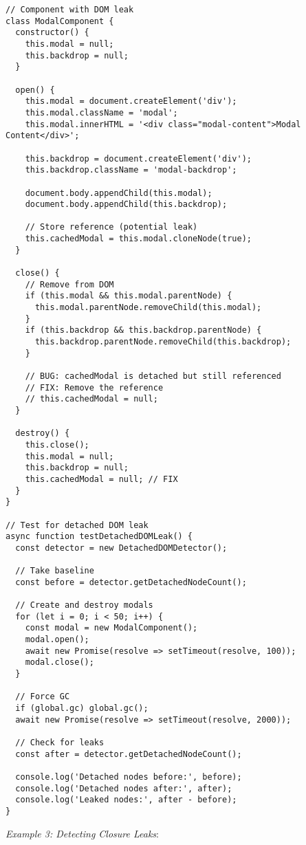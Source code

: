 \documentclass[11pt]{article}
\begin{document}
\begin{verbatim}
// Component with DOM leak
class ModalComponent {
  constructor() {
    this.modal = null;
    this.backdrop = null;
  }
  
  open() {
    this.modal = document.createElement('div');
    this.modal.className = 'modal';
    this.modal.innerHTML = '<div class="modal-content">Modal Content</div>';
    
    this.backdrop = document.createElement('div');
    this.backdrop.className = 'modal-backdrop';
    
    document.body.appendChild(this.modal);
    document.body.appendChild(this.backdrop);
    
    // Store reference (potential leak)
    this.cachedModal = this.modal.cloneNode(true);
  }
  
  close() {
    // Remove from DOM
    if (this.modal && this.modal.parentNode) {
      this.modal.parentNode.removeChild(this.modal);
    }
    if (this.backdrop && this.backdrop.parentNode) {
      this.backdrop.parentNode.removeChild(this.backdrop);
    }
    
    // BUG: cachedModal is detached but still referenced
    // FIX: Remove the reference
    // this.cachedModal = null;
  }
  
  destroy() {
    this.close();
    this.modal = null;
    this.backdrop = null;
    this.cachedModal = null; // FIX
  }
}

// Test for detached DOM leak
async function testDetachedDOMLeak() {
  const detector = new DetachedDOMDetector();
  
  // Take baseline
  const before = detector.getDetachedNodeCount();
  
  // Create and destroy modals
  for (let i = 0; i < 50; i++) {
    const modal = new ModalComponent();
    modal.open();
    await new Promise(resolve => setTimeout(resolve, 100));
    modal.close();
  }
  
  // Force GC
  if (global.gc) global.gc();
  await new Promise(resolve => setTimeout(resolve, 2000));
  
  // Check for leaks
  const after = detector.getDetachedNodeCount();
  
  console.log('Detached nodes before:', before);
  console.log('Detached nodes after:', after);
  console.log('Leaked nodes:', after - before);
}
\end{verbatim}

\emph{Example 3: Detecting Closure Leaks}:
\end{document}
